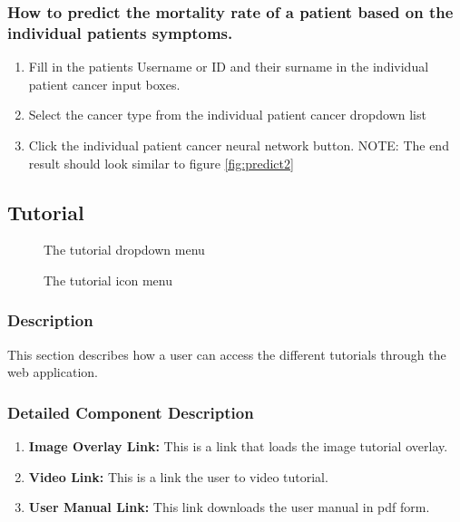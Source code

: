 \documentclass[14pt, a4paper]{article}
\begin{document}
\subsubsection{How to predict the mortality rate of a patient based on the individual patients symptoms.}
\begin{enumerate}
\item Fill in the patients Username or ID and their surname in the individual patient cancer input boxes.
\item Select the cancer type from the individual patient cancer dropdown list
\item Click the individual patient cancer neural network button. NOTE: The end result should look similar to figure \ref{fig:predict2}
\end{enumerate}
\subsection{Tutorial} 
\begin{figure}[H]
\centerline{}
\caption{The tutorial dropdown menu}
\label{fig:tut1}
\end{figure}
\begin{figure}[H]
\centerline{}
\caption{The tutorial icon menu}
\label{fig:tut2}
\end{figure}
\subsubsection{Description}This section describes how a user can access the different tutorials through the web application.
\subsubsection{Detailed Component Description}
\begin{enumerate}
\item \textbf{Image Overlay Link:} This is a link that loads the image tutorial overlay.
\item \textbf{Video Link:} This is a link the user to video tutorial.
\item \textbf{User Manual Link:} This link downloads the user manual in pdf form.
\end{enumerate}
\end{document}
